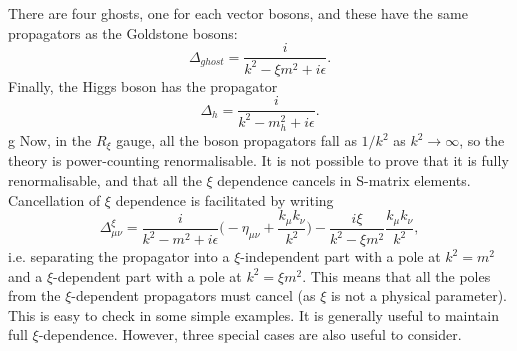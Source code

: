 \documentclass[a4paper,12pt]{article}
\begin{document}
There are four ghosts, one for each vector bosons, and these have the same propagators as the Goldstone bosons:
\begin{equation}
\Delta_{ghost} = \frac{i}{k^2 - \xi m^2 + i\epsilon}.
\end{equation}
Finally, the Higgs boson has the propagator
\begin{equation}
\Delta_{h} = \frac{i}{k^2 -  m_h^2 + i\epsilon}.
\end{equation} g
Now, in the $R_\xi$ gauge, all the boson propagators fall as $1/k^2$ as $k^2 \to \infty$, so the theory is power-counting renormalisable. It is not possible to prove that it is fully renormalisable, and that all the $\xi$ dependence cancels in S-matrix elements. Cancellation of $\xi$ dependence is facilitated by writing
\begin{equation}
\Delta_{\mu \nu}^\xi = \frac{i}{k^2 - m^2 + i\epsilon}\bigg(-\eta_{\mu \nu} + \frac{k_\mu k_\nu}{k^2} \bigg) - \frac{i\xi}{k^2 - \xi m^2}\frac{k_\mu k_\nu}{k^2},
\end{equation}
i.e. separating the propagator into a $\xi$-independent part with a pole at $k^2 = m^2$ and a $\xi$-dependent part with a pole at $k^2 = \xi m^2$. This means that all the poles from the $\xi$-dependent propagators must cancel (as $\xi$ is not a physical parameter). This is easy to check in some simple examples. It is generally useful to maintain full $\xi$-dependence. However, three special cases are also useful to consider.
\end{document}
